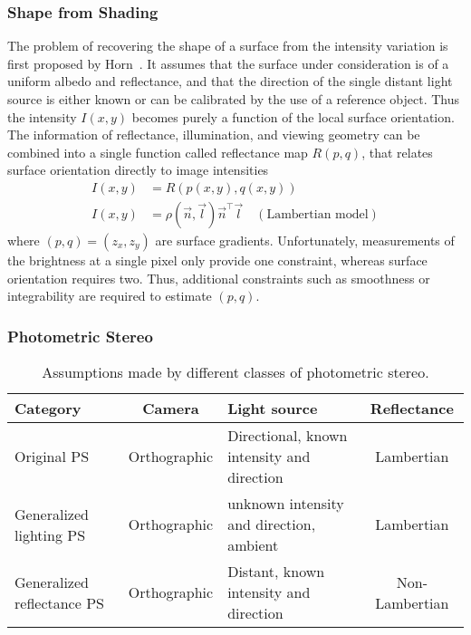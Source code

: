 \subsubsection{Shape from Shading}
The problem of recovering the shape of a surface from the intensity variation is first proposed by Horn~\cite{horn1970shape}. It assumes that the surface under consideration is of a uniform albedo and reflectance, and that the direction of the single distant light source is either known or can be calibrated by the use of a reference object. Thus the intensity $I(x,y)$ becomes purely a function of the local surface orientation. The information of reflectance, illumination, and viewing geometry can be combined into a single function called reflectance map $R(p, q)$, that relates surface orientation directly to image intensities
\begin{align*}
I(x, y) &= R(p(x, y), q(x, y))\\
I(x, y) &= \rho(\vec{n},\vec{l})\vec{n}^\top\vec{l} \quad (\text{Lambertian model})
\end{align*}
where $(p, q) = (z_x, z_y)$ are surface gradients. Unfortunately, measurements of the brightness at a single pixel only provide one constraint, whereas surface orientation requires two. Thus, additional constraints such as smoothness or integrability are required to estimate $(p, q)$.

\subsubsection{Photometric Stereo}
\begin{table}[h]
  \centering
  \begin{tabular}{p{2cm}|cp{4cm}c}
  \toprule
  \textbf{Category} & Camera & Light source & Reflectance \\
  \midrule
  Original PS & Orthographic & Directional, known intensity and direction & Lambertian \\
  Generalized lighting PS & Orthographic & unknown intensity and direction, ambient & Lambertian \\
  Generalized reflectance PS & Orthographic & Distant, known intensity and direction & Non-Lambertian \\
  \bottomrule
  \end{tabular}
  \caption{Assumptions made by different classes of photometric stereo.}
  \label{tab:ps_assumptions}
\end{table}

